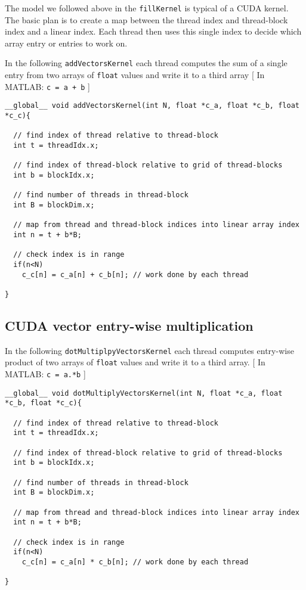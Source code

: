 The model we followed above in the \texttt{fillKernel} is typical of a CUDA kernel. The basic plan is to create a map between the thread index and thread-block index and a linear index. Each thread then uses this single index to decide which array entry or entries to work on.

In the following \texttt{addVectorsKernel} each thread computes the sum of a single entry from two arrays of \texttt{float} values and write it to a third array [ In MATLAB: \texttt{c = a + b} ]

\begin{verbatim}
__global__ void addVectorsKernel(int N, float *c_a, float *c_b, float *c_c){

  // find index of thread relative to thread-block
  int t = threadIdx.x;
  
  // find index of thread-block relative to grid of thread-blocks
  int b = blockIdx.x;
  
  // find number of threads in thread-block
  int B = blockDim.x;

  // map from thread and thread-block indices into linear array index
  int n = t + b*B;

  // check index is in range
  if(n<N)
    c_c[n] = c_a[n] + c_b[n]; // work done by each thread

}
\end{verbatim}


\subsection{CUDA vector entry-wise multiplication}

In the following \texttt{dotMultiplpyVectorsKernel} each thread computes entry-wise product of two arrays of \texttt{float} values and write it to a third array. [ In MATLAB: \texttt{c = a.*b} ]

\begin{verbatim}
__global__ void dotMultiplyVectorsKernel(int N, float *c_a, float *c_b, float *c_c){

  // find index of thread relative to thread-block
  int t = threadIdx.x;
  
  // find index of thread-block relative to grid of thread-blocks
  int b = blockIdx.x;
  
  // find number of threads in thread-block
  int B = blockDim.x;

  // map from thread and thread-block indices into linear array index
  int n = t + b*B;

  // check index is in range
  if(n<N)
    c_c[n] = c_a[n] * c_b[n]; // work done by each thread

}
\end{verbatim}


